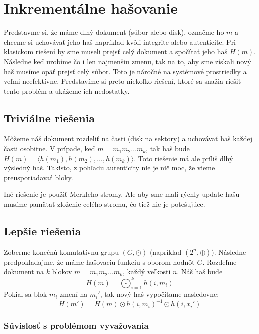 \section{Inkrementálne hašovanie}

Predstavme si, že máme dlhý dokument (súbor alebo disk),
označme ho $m$ a chceme si uchovávať jeho haš napríklad kvôli
integrite alebo autenticite. Pri klasickom riešení
by sme museli prejsť celý dokument a spočítať jeho 
haš $H(m)$. Následne keď urobíme čo i len najmenšiu
zmenu, tak na to, aby sme získali nový haš musíme opäť
prejsť celý súbor. Toto je náročné na systémové prostriedky
a veľmi neefektívne. Predstavíme si preto niekoľko riešení, ktoré sa
snažia riešiť tento problém a ukážeme ich nedostatky.

\subsection{Triviálne riešenia}

Môžeme náš dokument rozdeliť na časti (disk na sektory)
a uchovávať haš každej časti osobitne. V prípade, keď
$m = m_1 m_2 \dots m_k$, tak haš bude 
$H(m) = \langle h(m_1), h(m_2), \dots, h(m_k) \rangle$.
Toto riešenie má ale príliš dlhý výsledný haš.
Takisto, z pohľadu autenticity nie je nič moc, že vieme
preusporiadavať bloky.

Iné riešenie je použiť Merkleho stromy. Ale aby
sme mali rýchly update hašu musíme pamätať zloženie celého stromu,
čo tiež nie je potešujúce.


\subsection{Lepšie riešenia}

Zoberme konečnú komutatívnu grupu $(G, \odot)$ (napríklad $(2^n, \oplus)$).
Následne predpokladajme, že máme hašovaciu funkciu s oborom hodnôť $G$.
Rozdeľme dokument na $k$ blokov $m = m_1 m_2 \dots m_k$, každý
veľkosti $n$. Náš haš bude 
\begin{equation*}
    H(m) = \bigodot_{i=1}^k h(i, m_i)
\end{equation*}
Pokiaľ sa blok $m_i$ zmení na $m_i'$, tak nový haš vypočítame
nasledovne:
\begin{equation*}
    H(m') = H(m) \odot h(i, m_i)^{-1} \odot h(i, x_i')
\end{equation*}

\subsubsection{Súvislosť s problémom vyvažovania}

